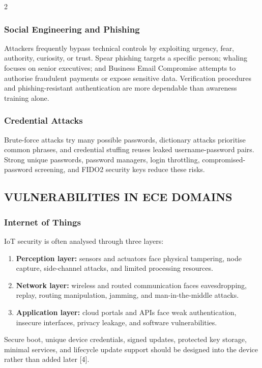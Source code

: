 \begin{multicols}{2}
  \subsubsection*{Social Engineering and Phishing}
  Attackers frequently bypass technical controls by exploiting urgency, fear, authority, curiosity, or trust. Spear phishing targets a specific person; whaling focuses on senior executives; and Business Email Compromise attempts to authorise fraudulent payments or expose sensitive data. Verification procedures and phishing-resistant authentication are more dependable than awareness training alone.

  \subsubsection*{Credential Attacks}
  Brute-force attacks try many possible passwords, dictionary attacks prioritise common phrases, and credential stuffing reuses leaked username-password pairs. Strong unique passwords, password managers, login throttling, compromised-password screening, and FIDO2 security keys reduce these risks.

  \subsection*{\centering\uppercase{Vulnerabilities in ECE Domains}}
  \subsubsection*{Internet of Things}
  IoT security is often analysed through three layers:
  \begin{enumerate}\justifying
    \item \textbf{Perception layer:} sensors and actuators face physical tampering, node capture, side-channel attacks, and limited processing resources.
    \item \textbf{Network layer:} wireless and routed communication faces eavesdropping, replay, routing manipulation, jamming, and man-in-the-middle attacks.
    \item \textbf{Application layer:} cloud portals and APIs face weak authentication, insecure interfaces, privacy leakage, and software vulnerabilities.
  \end{enumerate}
  Secure boot, unique device credentials, signed updates, protected key storage, minimal services, and lifecycle update support should be designed into the device rather than added later [4].


\end{multicols}
